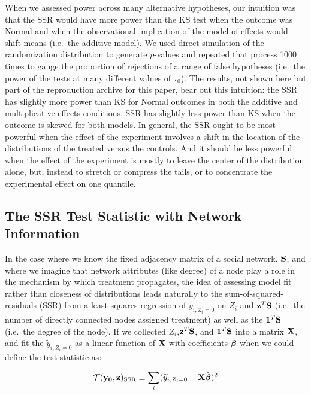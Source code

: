 When we assessed power across many alternative hypotheses, our intuition was
that the SSR would have more power than the KS test when the outcome was
Normal and when the observational implication of the model of effects would
shift means (i.e.\ the additive model). We used direct simulation of the
randomization distribution to generate $p$-values and repeated that process
1000 times to gauge the proportion of rejections of a range of false
hypotheses  (i.e.\ the power of the tests at many different values of
$\tau_0$). The results, not shown here but part of the reproduction archive
for this paper, bear out this intuition: the SSR has slightly more power than
KS for Normal outcomes in both the additive and multiplicative effects
conditions. SSR has slightly less power than KS when the outcome is skewed for
both models. In general, the SSR ought to be most powerful when the effect of
the experiment involves a shift in the location of the distributions of the
treated versus the controls. And it should be less powerful when the effect of
the experiment is mostly to leave the center of the distribution alone, but,
instead to stretch or compress the tails, or to concentrate the experimental
effect on one quantile.

\subsection{The SSR Test Statistic with Network Information}

In the case where we know the fixed adjacency matrix of a social network,
$\mathbf{S}$, and where we imagine that network attributes (like degree) of a node
play a role in the mechanism by which treatment propagates, the idea of
assessing model fit rather than closeness of distributions leads naturally to
the sum-of-squared-residuals (SSR) from a least squares regression of $
\widetilde y_{i,Z_i=0}$ on $Z_{i}$ and $\mathbf{z}^{T} \mathbf{S}$ (i.e.\ the number of
directly connected nodes assigned treatment) as well as the $\mathbf{1}^{T}
\mathbf{S}$ (i.e.\ the degree of the node). If we collected $Z_{i}$,$\mathbf{z}^{T} \mathbf{S}$,
and $\mathbf{1}^{T} \mathbf{S}$ into a matrix $\mathbf{X}$, and fit the $\widetilde
y_{i,Z_i=0}$ as a linear function of $\mathbf{X}$ with coefficients $\boldsymbol{\beta}$ when we
could define the test statistic as:

\begin{equation}
 \mathcal{T}(\mathbf{y}_{\mathbf{0}},\mathbf{z})_{\text{SSR}} \equiv \sum_{i} ( \widetilde y_{i,Z_i=0} - \mathbf{X}\hat{\boldsymbol{\beta}} )^2 \label{eq:ssr}
\end{equation}


